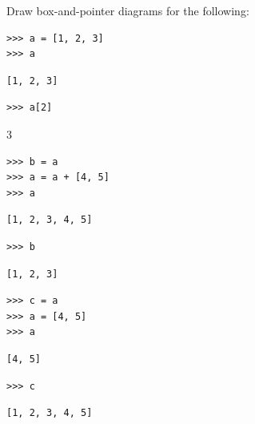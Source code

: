\documentclass{exam}
\begin{document}
\begin{questions}
\begin{blocksection}
\question Draw box-and-pointer diagrams for the following:

\begin{lstlisting}
>>> a = [1, 2, 3]
>>> a
\end{lstlisting}
\begin{solution}[.25in]
\begin{lstlisting}
[1, 2, 3]
\end{lstlisting}
\end{solution}

\begin{lstlisting}
>>> a[2]
\end{lstlisting}
\begin{solution}[.25in]
3
\end{solution}

\begin{lstlisting}
>>> b = a
>>> a = a + [4, 5]
>>> a
\end{lstlisting}
\begin{solution}[.25in]
\begin{lstlisting}
[1, 2, 3, 4, 5]
\end{lstlisting}
\end{solution}
\end{blocksection}
\begin{blocksection}
\begin{lstlisting}
>>> b
\end{lstlisting}
\begin{solution}[.25in]
\begin{lstlisting}
[1, 2, 3]
\end{lstlisting}
\end{solution}

\begin{lstlisting}
>>> c = a
>>> a = [4, 5]
>>> a
\end{lstlisting}
\begin{solution}[.25in]
\begin{lstlisting}
[4, 5]
\end{lstlisting}
\end{solution}

\begin{lstlisting}
>>> c
\end{lstlisting}
\begin{solution}[.25in]
\begin{lstlisting}
[1, 2, 3, 4, 5]
\end{lstlisting}
\end{solution}


\end{blocksection}
\end{questions}
\end{document}
